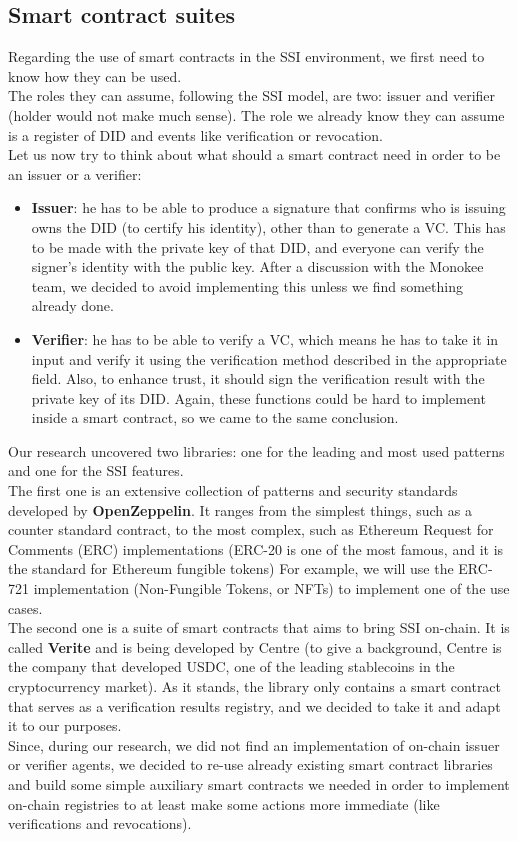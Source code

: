 \subsection{Smart contract suites}
Regarding the use of smart contracts in the SSI environment, we first need to know how they 
can be used.\\
The roles they can assume, following the SSI model, are two: issuer and verifier (holder 
would not make much sense). The role we already know they can assume is a register of DID 
and events like verification or revocation.
\vspace{0.3cm}\\
Let us now try to think about what should a smart contract need in order to be an issuer or 
a verifier:
\begin{itemize}
    \item \textbf{Issuer}: he has to be able to produce a signature that confirms who is 
    issuing owns the DID (to certify his identity), other than to generate a VC.
    This has to be made with the private key of that DID, and everyone can verify the signer's 
    identity with the public key. After a discussion with the Monokee team, we decided to 
    avoid implementing this unless we find something already done.
    \item \textbf{Verifier}: he has to be able to verify a VC, which means he has to take it 
    in input and verify it using the verification method described in the appropriate field. 
    Also, to enhance trust, it should sign the verification result with the private key of 
    its DID. Again, these functions could be hard to implement inside a smart contract, so we 
    came to the same conclusion.
\end{itemize}
Our research uncovered two libraries: one for the leading and most used patterns and one 
for the SSI features.\\
The first one is an extensive collection of patterns and security standards developed by 
\textbf{OpenZeppelin}\cite{site:openzeppelin}. It ranges from the simplest things, such as a counter standard contract, to 
the most complex, such as Ethereum Request for Comments (ERC) implementations (ERC-20 is 
one of the most famous, and it is the standard for Ethereum fungible tokens)
For example, we will use the ERC-721 implementation (Non-Fungible Tokens, or NFTs) to 
implement one of the use cases.\\
The second one is a suite of smart contracts that aims to bring SSI on-chain. It is called 
\textbf{Verite}\cite{site:verite} and is being developed by Centre (to give a background, Centre is the company
that developed USDC, one of the leading stablecoins in the cryptocurrency market).
As it stands, the library only contains a smart contract that serves as a verification 
results registry, and we decided to take it and adapt it to our purposes.
\vspace{0.3cm}\\
Since, during our research, we did not find an implementation of on-chain issuer or verifier 
agents, we decided to re-use already existing smart contract libraries and build some simple
auxiliary smart contracts we needed in order to implement on-chain registries to at least 
make some actions more immediate (like verifications and revocations).
